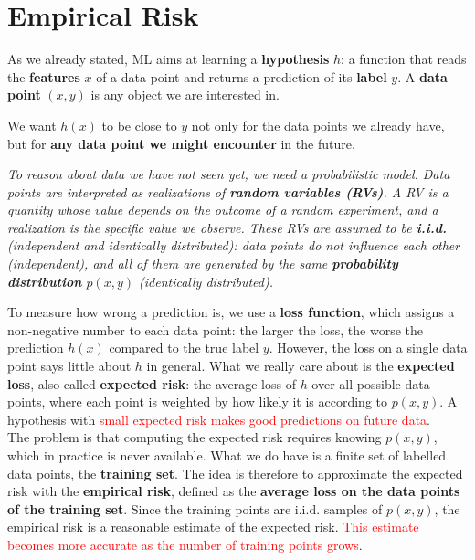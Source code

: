 \chapter{Empirical Risk}
As we already stated, ML aims at learning a \textbf{hypothesis} $h$: a function that reads the \textbf{features} $x$ of a data point and returns a prediction of its \textbf{label} $y$. A \textbf{data point} $(x,y)$ is any object we are interested in. 

We want $h(x)$ to be close to $y$ not only for the data points we already have, but for \textbf{any data point we might encounter} in the future.\\

\begin{center}
    \textit{To reason about data we have not seen yet, we need a probabilistic model. Data points are interpreted as realizations of \textbf{random variables (RVs)}. A RV is a quantity whose value depends on the outcome of a random experiment, and a realization is the specific value we observe. These RVs are assumed to be \textbf{i.i.d.} (independent and identically distributed): data points do not influence each other (independent), and all of them are generated by the same \textbf{probability distribution} $p(x,y)$ (identically distributed). }
\end{center}

To measure how wrong a prediction is, we use a \textbf{loss function}, which assigns a non-negative number to each data point: the larger the loss, the worse the prediction $h(x)$ compared to the true label $y$. However, the loss on a single data point says little about $h$ in general. What we really care about is the \textbf{expected loss}, also called \textbf{expected risk}: the average loss of $h$ over all possible data points, where each point is weighted by how likely it is according to $p(x,y)$. A hypothesis with \textcolor{red}{small expected risk makes good predictions on future data}.\\

The problem is that computing the expected risk requires knowing $p(x,y)$, which in practice is never available. What we do have is a finite set of labelled data points, the \textbf{training set}. The idea is therefore to approximate the expected risk with the \textbf{empirical risk}, defined as the \textbf{average loss on the data points of the training set}. Since the training points are i.i.d. samples of $p(x,y)$, the empirical risk is a reasonable estimate of the expected risk. \textcolor{red}{This estimate becomes more accurate as the number of training points grows}.\\

